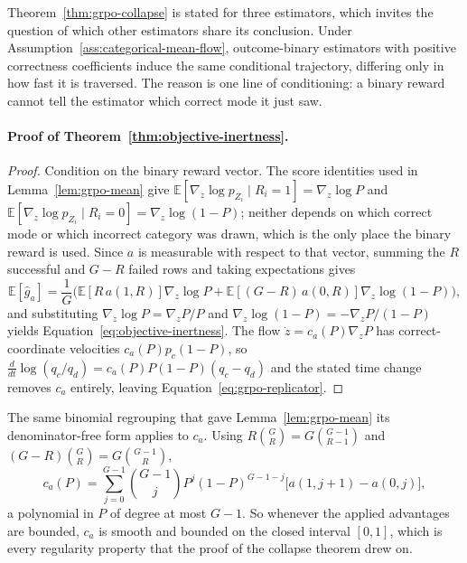 \documentclass{article}
\newcommand{\enforcehalffinalproseline}{%
  \setlength{\parfillskip}{0pt plus .20\linewidth}}
\newcommand{\1}{\mathbf 1}
\newcommand{\E}{\mathbb E}
\theoremstyle{remark}
\theoremstyle{definition}
\theoremstyle{plain}
\begin{document}
Theorem~\ref{thm:grpo-collapse} is stated for three estimators, which invites
the question of which other estimators share its conclusion. Under
Assumption~\ref{ass:categorical-mean-flow}, outcome-binary estimators with
positive correctness coefficients induce the same conditional trajectory,
differing only in how fast it is traversed. The
reason is one line of conditioning: a binary reward cannot tell the estimator
which correct mode it just saw.

\paragraph{Proof of Theorem~\ref{thm:objective-inertness}.}

\begin{proof}
\enforcehalffinalproseline
Condition on the binary reward vector. The score identities used in
Lemma~\ref{lem:grpo-mean} give
$\E[\nabla_z\log p_{Z_i}\mid R_i=1]=\nabla_z\log P$ and
$\E[\nabla_z\log p_{Z_i}\mid R_i=0]=\nabla_z\log(1-P)$; neither depends on
which correct mode or which incorrect category was drawn, which is the only
place the binary reward is used. Since $a$ is measurable with respect to that
vector, summing the $R$ successful and $G-R$ failed rows and taking
expectations gives
\[
  \E[\widehat g_a]
  =\frac1G\Big(\E[R\,a(1,R)]\nabla_z\log P
   +\E[(G-R)\,a(0,R)]\nabla_z\log(1-P)\Big),
\]
and substituting $\nabla_z\log P=\nabla_zP/P$ and
$\nabla_z\log(1-P)=-\nabla_zP/(1-P)$ yields
Equation~\eqref{eq:objective-inertness}. The flow
$\dot z=c_a(P)\nabla_zP$ has correct-coordinate velocities
$c_a(P)p_c(1-P)$, so $\frac{d}{dt}\log(q_c/q_d)=c_a(P)P(1-P)(q_c-q_d)$ and the
stated time change removes $c_a$ entirely, leaving
Equation~\eqref{eq:grpo-replicator}.
\end{proof}


The same binomial regrouping that gave Lemma~\ref{lem:grpo-mean} its
denominator-free form applies to $c_a$. Using $R\binom GR=G\binom{G-1}{R-1}$
and $(G-R)\binom GR=G\binom{G-1}{R}$,
\begin{equation}
 c_a(P)=\sum_{j=0}^{G-1}\binom{G-1}{j}P^j(1-P)^{G-1-j}
 \big[a(1,j+1)-a(0,j)\big],
 \label{eq:inertness-polynomial}
\end{equation}
a polynomial in $P$ of degree at most $G-1$. So whenever the applied advantages
are bounded, $c_a$ is smooth and bounded on the closed interval $[0,1]$, which
is every regularity property that the proof of the collapse theorem drew on.
\end{document}
